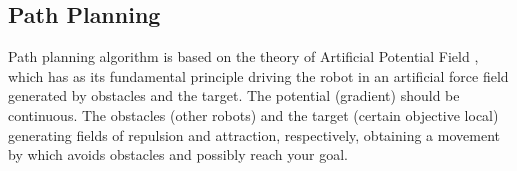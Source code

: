 \subsection{Path Planning}

Path planning algorithm is based on the theory of Artificial Potential Field \cite{CPA}, which has as its fundamental principle driving
the robot in an artificial force field generated by obstacles and the target. The potential (gradient) should be continuous.
The obstacles (other robots) and the target (certain objective local) generating fields of repulsion and attraction, respectively,
obtaining a movement by which avoids obstacles and possibly reach your goal.

